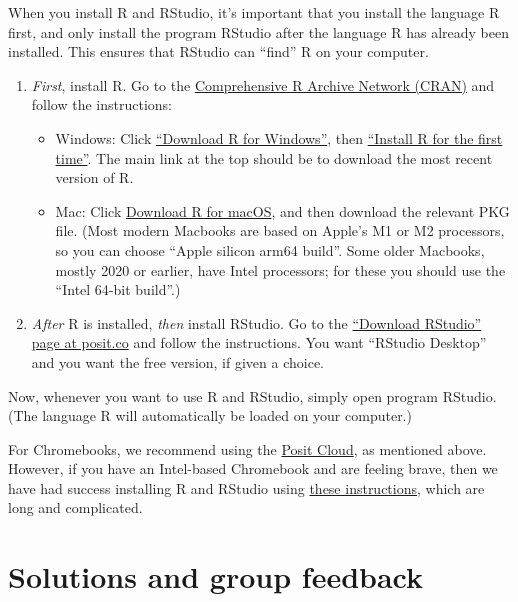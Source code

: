 \documentclass[
  a4paper,
]{book}
\providecommand{\tightlist}{%
  \setlength{\itemsep}{0pt}\setlength{\parskip}{0pt}}
\newif\ifcomm\commtrue
\theoremstyle{definition}
\theoremstyle{definition}
\theoremstyle{definition}
\theoremstyle{definition}
\theoremstyle{remark}
\begin{document}
When you install R and RStudio, it's important that you install the language R first, and only install the program RStudio after the language R has already been installed. This ensures that RStudio can ``find'' R on your computer.

\begin{enumerate}
\def\labelenumi{\arabic{enumi}.}
\item
  \emph{First}, install R. Go to the \href{https://cran.r-project.org/}{Comprehensive R Archive Network (CRAN)} and follow the instructions:

  \begin{itemize}
  \tightlist
  \item
    Windows: Click \href{https://cran.r-project.org/bin/windows/}{``Download R for Windows''}, then \href{https://cran.r-project.org/bin/windows/base/}{``Install R for the first time''}. The main link at the top should be to download the most recent version of R.
  \item
    Mac: Click \href{https://cran.r-project.org/bin/macosx/}{Download R for macOS}, and then download the relevant PKG file. (Most modern Macbooks are based on Apple's M1 or M2 processors, so you can choose ``Apple silicon arm64 build''. Some older Macbooks, mostly 2020 or earlier, have Intel processors; for these you should use the ``Intel 64-bit build''.)
  \end{itemize}
\item
  \emph{After} R is installed, \emph{then} install RStudio. Go to the \href{https://posit.co/download/rstudio-desktop/}{``Download RStudio'' page at posit.co} and follow the instructions. You want ``RStudio Desktop'' and you want the free version, if given a choice.
\end{enumerate}

Now, whenever you want to use R and RStudio, simply open program RStudio. (The language R will automatically be loaded on your computer.)

For Chromebooks, we recommend using the \href{https://posit.cloud}{Posit Cloud}, as mentioned above. However, if you have an Intel-based Chromebook and are feeling brave, then we have had success installing R and RStudio using \href{https://levente.littvay.hu/chromebook/}{these instructions}, which are long and complicated.

\commtrue

\hypertarget{solutions}{%
\chapter*{Solutions and group feedback}\label{solutions}}
\end{document}
